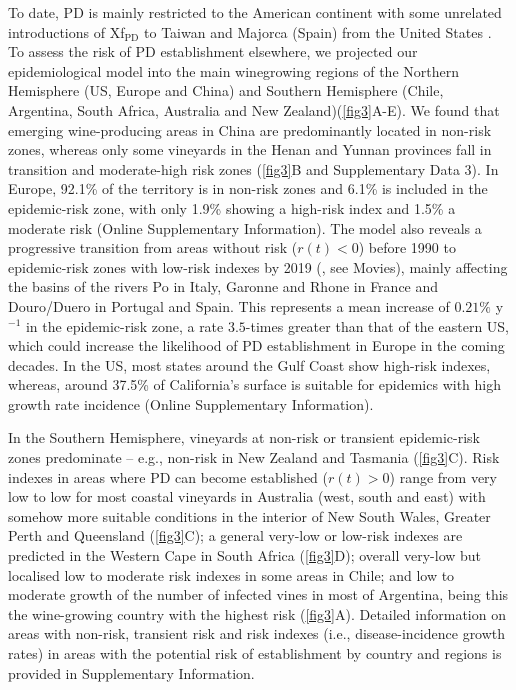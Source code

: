     To date, PD is mainly restricted to the American continent with some
    unrelated
    introductions of Xf$_{\textrm{PD}}$ to Taiwan and Majorca (Spain) from the
    United States \cite{Moralejo2019,Su2013}. To assess the risk of PD
    establishment elsewhere, we projected our epidemiological model into the
    main
    winegrowing regions of the Northern Hemisphere (US, Europe and China) and
    Southern Hemisphere (Chile, Argentina, South Africa, Australia and New
    Zealand)(\cref{fig3}A-E). We found that emerging wine-producing areas in
    China
    are predominantly located in non-risk zones, whereas only some vineyards in
    the
    Henan and Yunnan provinces fall in transition and moderate-high risk zones
    (\cref{fig3}B and Supplementary Data 3). In Europe, 92.1\% of the territory
    is
    in non-risk zones and 6.1\% is included in the epidemic-risk zone, with
    only
    1.9\% showing a high-risk index and 1.5\% a moderate risk
    (Online Supplementary Information).
    The model also reveals a progressive transition from areas without risk
    ($r(t)
< 0$) before 1990 to epidemic-risk zones with low-risk indexes by 2019
    (\cite{Webpage}, see Movies), mainly affecting the basins of the rivers Po
    in
    Italy, Garonne and Rhone in France and Douro/Duero in Portugal and Spain.
    This
    represents a mean increase of $0.21\%$ y$^{-1}$ in the epidemic-risk zone,
    a
    rate $3.5$-times greater than that of the eastern US, which could increase
    the
    likelihood of PD establishment in Europe in the coming decades. In the US,
    most
    states around the Gulf Coast show high-risk indexes, whereas, around 37.5\%
    of
    California's surface is suitable for epidemics with high growth rate
    incidence
    (Online Supplementary Information).

    In the Southern Hemisphere, vineyards at non-risk or transient
    epidemic-risk
    zones predominate -- e.g., non-risk in New Zealand and Tasmania
    (\cref{fig3}C).
    Risk indexes in areas where PD can become established ($r(t) > 0$) range
    from
    very low to low for most coastal vineyards in Australia (west, south and
    east)
    with somehow more suitable conditions in the interior of New South Wales,
    Greater Perth and Queensland (\cref{fig3}C); a general very-low or low-risk
    indexes are predicted in the Western Cape in South Africa (\cref{fig3}D);
    overall very-low but localised low to moderate risk indexes in some areas
    in
    Chile; and low to moderate growth of the number of infected vines in most
    of
    Argentina, being this the wine-growing country with the highest risk
    (\cref{fig3}A). Detailed information on areas with non-risk, transient risk
    and
    risk indexes (i.e., disease-incidence growth rates) in areas with the
    potential
    risk of establishment by country and regions is provided in Supplementary
    Information.


